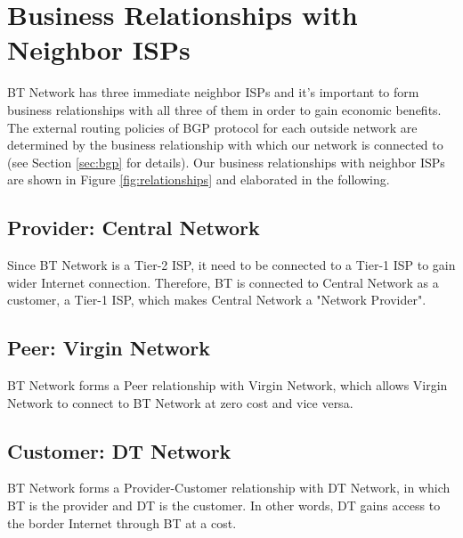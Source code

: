 \section{Business Relationships with Neighbor ISPs}
\label{sec:relationships}

BT Network has three immediate neighbor ISPs and it's important to form business relationships with all three of them in order to gain economic benefits. 
The external routing policies of BGP protocol for each outside network are determined by the business relationship with which our network is connected to (see Section \ref{sec:bgp} for details).
Our business relationships with neighbor ISPs are shown in Figure \ref{fig:relationships} and elaborated in the following.


\subsection{Provider: Central Network}
Since BT Network is a Tier-2 ISP, it need to be connected to a Tier-1 ISP to gain wider Internet connection. Therefore, BT is connected to Central Network as a customer, a Tier-1 ISP, which makes Central Network a "Network Provider".

\subsection{Peer: Virgin Network}
BT Network forms a Peer relationship with Virgin Network, which allows Virgin Network to connect to BT Network at zero cost and vice versa.

\subsection{Customer: DT Network}
\label{sec:dt}
BT Network forms a Provider-Customer relationship with DT Network, in which BT is the provider and DT is the customer. In other words, DT gains access to the border Internet through BT at a cost.
